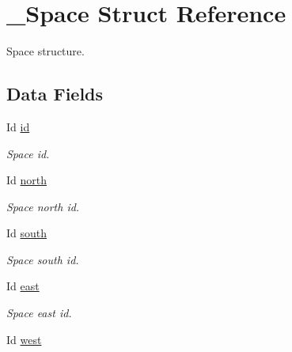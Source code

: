 \hypertarget{struct__Space}{}\section{\+\_\+\+Space Struct Reference}
\label{struct__Space}


Space structure.  


\subsection*{Data Fields}
\begin{DoxyCompactItemize}
\item 
\mbox{\label{struct__Space_a70cb461deb9ac073e401b607339b567f}} 
Id \hyperlink{struct__Space_a70cb461deb9ac073e401b607339b567f}{id}
\begin{DoxyCompactList}\small\item\em Space id. \end{DoxyCompactList}\item 
\mbox{\label{struct__Space_ae5ebe53ce79514d7d2d93911e0159252}} 
Id \hyperlink{struct__Space_ae5ebe53ce79514d7d2d93911e0159252}{north}
\begin{DoxyCompactList}\small\item\em Space north id. \end{DoxyCompactList}\item 
\mbox{\label{struct__Space_a646b68c22a0bbf1685033c96109d31d1}} 
Id \hyperlink{struct__Space_a646b68c22a0bbf1685033c96109d31d1}{south}
\begin{DoxyCompactList}\small\item\em Space south id. \end{DoxyCompactList}\item 
\mbox{\label{struct__Space_a41ce2bf33cf0c157b358221f094ee05b}} 
Id \hyperlink{struct__Space_a41ce2bf33cf0c157b358221f094ee05b}{east}
\begin{DoxyCompactList}\small\item\em Space east id. \end{DoxyCompactList}\item 
\mbox{\label{struct__Space_a20c1d259e93b44e24ba82982e142eb9b}} 
Id \hyperlink{struct__Space_a20c1d259e93b44e24ba82982e142eb9b}{west}

\end{DoxyCompactItemize}
